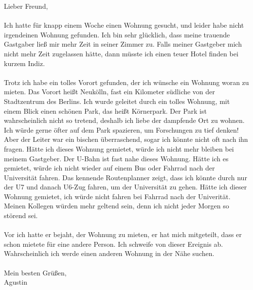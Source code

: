 \documentclass{article}
\begin{document}
Lieber Freund,\\~\\
Ich hatte für knapp einem Woche einen Wohnung gesucht, und leider habe nicht irgendeinen Wohnung gefunden. Ich bin sehr glücklich, dass meine trauende Gastgaber ließ mir mehr Zeit in seiner Zimmer zu. Falls meiner Gastgeber mich nicht mehr Zeit zugelassen hätte, dann müsste ich einen teuer Hotel finden bei kurzem Indiz.\\~\\
Trotz ich habe ein tolles Vorort gefunden, der ich wünsche ein Wohnung woran zu mieten. Das Vorort heißt Neukölln, fast ein Kilometer südliche von der Stadtzentrum des Berlins. Ich wurde geleitet durch ein tolles Wohnung, mit einem Blick einen schönen Park, das heißt Körnerpark. Der Park ist wahrscheinlich nicht so tretend, deshalb ich liebe der dampfende Ort zu wohnen. Ich würde gerne öfter auf dem Park spazieren, um Forschungen zu tief denken! Aber der Leiter war ein bischen überraschend, sogar ich könnte nicht oft nach ihn fragen. Hätte ich dieses Wohnung gemietet, würde ich nicht mehr bleiben bei meinem Gastgeber. Der U-Bahn ist fast nahe dieses Wohnung. Hätte ich es gemietet, würde ich nicht wieder auf einem Bus oder Fahrrad nach der Universität fahren. Das kennende Routenplanner zeigt, dass ich könnte durch nur der U7 und danach U6-Zug fahren, um der Universität zu gehen. Hätte ich dieser Wohnung gemietet, ich würde nicht fahren bei Fahrrad nach der Univerität. Meinen Kollegen würden mehr geltend sein, denn ich nicht jeder Morgen so störend sei.\\~\\
Vor ich hatte er bejaht, der Wohnung zu mieten, er hat mich mitgeteilt, dass er schon mietete für eine andere Person. Ich schweife von dieser Ereignis ab. Wahrscheinlich ich werde einen anderen Wohnung in der Nähe suchen.\\~\\
Mein besten Grüßen,\\
Agustin
\end{document}
